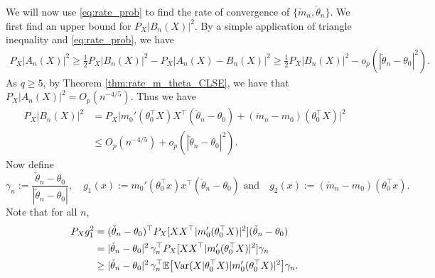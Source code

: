  We will now use \eqref{eq:rate_prob} to find the rate of convergence of $\{\check{m}_n, \check{\theta}_n\}$. We first find an upper bound for $P_X |B_n(X)|^2$. By a simple application of triangle inequality and \eqref{eq:rate_prob}, we have
\begin{align*}
P_X|A_n(X)|^2\ge \frac{1}{2} P_X|B_n(X)|^2- P_X|A_n(X)-B_n(X)|^2\ge\frac{1}{2} P_X|B_n(X)|^2- o_p(|\check{\theta}_n -\theta_0|^2).
\end{align*}
As $q\ge 5$, by Theorem \ref{thm:rate_m_theta_CLSE}, we have that $P_X|A_n(X)|^2 =O_p(n^{-4/5}).$
Thus we have 
\begin{equation}\label{eq:AnMinusBnBound}
\begin{split}
P_X|B_n(X)|^2 &= P_X\big|m_0'(\theta_0^{\top}X)X^{\top}(\check{\theta}_n - \theta_0) + (\check{m}_n - m_0)(\theta_0^{\top}X)\big|^2\\  &\le O_p(n^{-4/5}) +o_p(|\check{\theta}_n - \theta_0|^2).
\end{split}
\end{equation}
Now define
\begin{equation}\label{eq:def_g_1}
\gamma_n := \frac{\check{\theta}_n - \theta_0}{|\check{\theta}_n - \theta_0|},\quad g_1(x) := m_0'(\theta_0^{\top}x)x^{\top}(\check{\theta}_n - \theta_0)  \text{ and}\quad  g_2(x) := (\check{m}_n - m_0)(\theta_0^{\top}x).
\end{equation}
Note that for all $n$,
\begin{align}\label{eq:step_th6}
\begin{split}
P_Xg_1^2 &= (\check{\theta}_n - \theta_0)^{\top}P_X[XX^{\top}|m_0'(\theta_0^{\top}X)|^2](\check{\theta}_n - \theta_0)\\
&= |\check{\theta}_n - \theta_0|^2\, \gamma_n^\top P_X[XX^{\top}|m_0'(\theta_0^{\top}X)|^2]\gamma_n\\
&\ge |\check{\theta}_n - \theta_0|^2\, \gamma_n^\top\mathbb{E}\big[\mathrm{Var}(X|\theta_0^\top X) |m_0'(\theta_0^{\top}X)|^2\big]\gamma_n.
\end{split}
\end{align}
